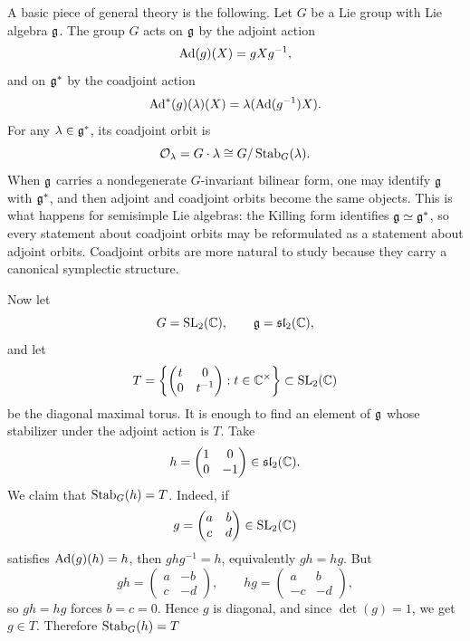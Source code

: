 \documentclass[12pt]{article}
\begin{document}
\begin{solution}
    A basic piece of general theory is the following. Let $G$ be a Lie group with Lie algebra $\mathfrak{g}$. The group $G$ acts on $\mathfrak{g}$ by the adjoint action
    \[
        \operatorname{Ad}(g)(X)=gXg^{-1},
    \]
    and on $\mathfrak{g}^*$ by the coadjoint action
    \[
        \operatorname{Ad}^*(g)(\lambda)(X)=\lambda(\operatorname{Ad}(g^{-1})X).
    \]
    For any $\lambda\in \mathfrak{g}^*$, its coadjoint orbit is
    \[
        \mathcal O_\lambda = G\cdot \lambda \cong G/\operatorname{Stab}_G(\lambda).
    \]
    When $\mathfrak{g}$ carries a nondegenerate $G$-invariant bilinear form, one may identify $\mathfrak{g}$ with $\mathfrak{g}^*$, and then adjoint and coadjoint orbits become the same objects. This is what happens for semisimple Lie algebras: the Killing form identifies $\mathfrak{g} \simeq \mathfrak{g}^*$, so every statement about coadjoint orbits may be reformulated as a statement about adjoint orbits. Coadjoint orbits are more natural to study because they carry a canonical symplectic structure.

    Now let
    \[
        G=\operatorname{SL}_2(\mathbb C), \qquad \mathfrak{g}=\mathfrak{sl}_2(\mathbb C),
    \]
    and let
    \[
        T=\left\{
        \begin{pmatrix}
            t & 0      \\
            0 & t^{-1}
        \end{pmatrix}
        : t\in \mathbb C^\times
        \right\}
        \subset \operatorname{SL}_2(\mathbb C)
    \]
    be the diagonal maximal torus. It is enough to find an element of $\mathfrak{g}$ whose stabilizer under the adjoint action is $T$. Take
    \[
        h=
        \begin{pmatrix}
            1 & 0  \\
            0 & -1
        \end{pmatrix}\in \mathfrak{sl}_2(\mathbb C).
    \]
    We claim that $\operatorname{Stab}_G(h)=T$. Indeed, if
    \[
        g=
        \begin{pmatrix}
            a & b \\
            c & d
        \end{pmatrix}\in \operatorname{SL}_2(\mathbb C)
    \]
    satisfies $\operatorname{Ad}(g)(h)=h$, then $ghg^{-1}=h$, equivalently $gh=hg$. But
    \[
        gh=
        \begin{pmatrix}
            a & -b \\
            c & -d
        \end{pmatrix},
        \qquad
        hg=
        \begin{pmatrix}
            a  & b  \\
            -c & -d
        \end{pmatrix},
    \]
    so $gh=hg$ forces $b=c=0$. Hence $g$ is diagonal, and since $\det(g)=1$, we get $g\in T$. Therefore $\operatorname{Stab}_G(h)=T$


\end{solution}
\end{document}
